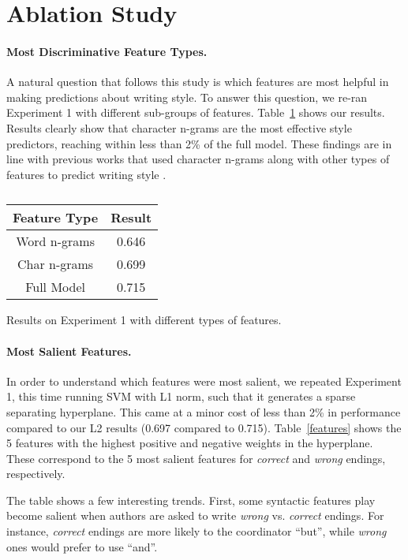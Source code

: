 \documentclass[11pt,a4paper]{article}
\newcommand{\tabref}[1]{Table~\ref{#1}}
\newcommand{\isection}[2]{\section{#1}\label{ssec:#2}}
\begin{document}
\isection{Ablation Study}{Ablation}



\paragraph{Most Discriminative Feature Types.}
A natural question that follows this study is which features are most helpful in making predictions about writing style. 
To answer this question, we re-ran Experiment 1 with different sub-groups of features. 
\tabref{subgroups} shows our results. Results clearly show that  character n-grams are the most effective style predictors, reaching within less than 2\% of the full model.
These findings are in line with previous works that used character n-grams along with other types of features to predict writing  style \cite{Schwartz:2013}.


\begin{table}[!t]
\begin{center}
\begin{tabular}{|c|c|} \hline
{\bf Feature Type} & {\bf Result}\\ \hline
Word n-grams & 0.646 \\ \hline
Char n-grams & 0.699 \\ \hline
Full Model & 0.715 \\ \hline

\end{tabular}
\end{center}
\caption{\label{subgroups}}
Results on Experiment 1 with different types of features.
\end{table}

\paragraph{Most Salient Features.}
In order to understand which features were most salient, we repeated Experiment 1, this time running SVM with L1 norm, such that it generates a sparse separating hyperplane. 
This came at a minor cost of less than 2\% in performance compared to our L2 results (0.697 compared to 0.715).  
\tabref{features} shows the 5 features with the highest positive and negative weights in the hyperplane. 
These correspond to the 5 most salient features for {\it correct} and {\it wrong} endings, respectively.

The table shows a few interesting trends. 
First, some syntactic features play become salient when authors are asked to write {\it wrong} vs. {\it correct} endings.
For instance, {\it correct} endings are more likely to the coordinator ``but'', while {\it wrong} ones would prefer to use ``and''.
\end{document}
